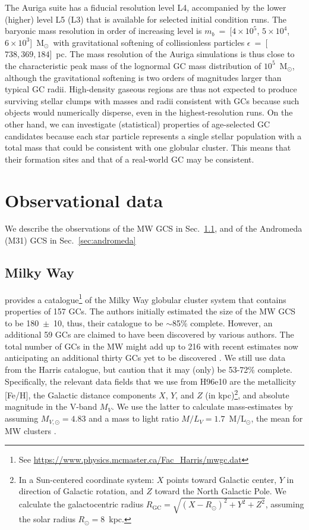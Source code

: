 \documentclass[a4paper,fleqn,usenatbib]{mnras}
\newcommand{\Sun}[0]{\ensuremath{_{\odot}}}
\providecommand{\DIFdelbegin}{} %
\begin{document}
The Auriga suite has a fiducial resolution level L4, accompanied by the lower
(higher) level L5 (L3) that is available for selected initial condition runs.
The baryonic mass resolution in order of increasing level is $m_b$~=~[$4 \times 10^5$,
$5 \times 10^4$, $6 \times 10^3$]~M\Sun \, with gravitational softening of
collissionless particles $\epsilon$~=~[$738, 369, 184$]~pc. The mass resolution
of the Auriga simulations is thus close to the characteristic peak mass of the
lognormal GC mass distribution of $10^{5}$~M\Sun \citep{1991ARA&A..29..543H},
although the gravitational softening is two orders of magnitudes larger than
typical GC radii. High-density gaseous regions are thus not expected to produce
surviving stellar clumps with masses and radii consistent with GCs because
such objects would numerically disperse, even in the highest-resolution runs.
On the other hand, we can investigate (statistical) properties of age-selected
GC candidates because each star particle represents a single stellar population
with a total mass that could be consistent with one globular cluster. This means
that their formation sites and that of a real-world GC may be consistent.

\section{Observational data}
\label{sec:observations}
We describe the observations of the MW GCS in Sec.~\ref{sec:milkyway},
and of the Andromeda (M31) GCS in Sec.~\ref{sec:andromeda}


\subsection{Milky Way}
\label{sec:milkyway}
\citet[][2010 edition; hereafter H96e10]{1996AJ....112.1487H} provides a
catalogue\footnote{See \url{https://www.physics.mcmaster.ca/Fac_Harris/mwgc.dat}}
of the Milky Way globular cluster system that contains properties of
157 GCs. The authors initially estimated the size of the MW GCS to be 180~$\pm$~10,
thus, their catalogue to be ${\sim}$85\% complete. However, an additional 59 GCs
are claimed to have been discovered by various authors. The total number of GCs
in the MW might add up to 216 with recent estimates now anticipating an additional 
thirty GCs yet to be discovered \citep[e.g.][and references therein]{2018ApJ...863L..38R}.
We still use data from the Harris catalogue, but caution that it may (only) be
53-72\% complete. Specifically, the relevant data fields that we use from H96e10
are the metallicity [Fe/H], the Galactic distance components $X$, $Y$, and $Z$ (in
kpc)\footnote{In a Sun-centered coordinate system: $X$ points toward Galactic
center, $Y$ in direction of Galactic rotation, and $Z$ toward the North Galactic
Pole. We calculate the galactocentric radius $R_{\text{GC}}=\sqrt{(X-R_\odot)^2
+ Y^2 + Z^2}$, assuming the solar radius $R_\odot=8$~kpc.}, and absolute
magnitude in the V-band $M_V$. We use the latter to calculate mass-estimates by
assuming $M_{V,\odot}=4.83$ and a mass to light ratio $M/L_V = 1.7$~M/L$_{\odot}$,
the mean for MW clusters \citep{2005ApJS..161..304M}. \DIFdelbegin %
\end{document}
